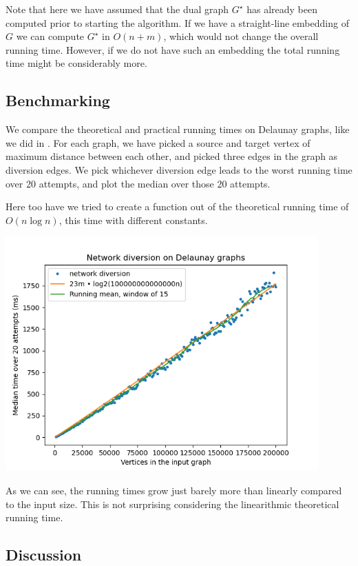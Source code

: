 Note that here we have assumed that the dual graph $G^\star$ has already been computed prior to starting the algorithm. If we have a straight-line embedding of $G$ we can compute $G^\star$ in $O(n+m)$, which would not change the overall running time. However, if we do not have such an embedding the total running time might be considerably more.

\subsection{Benchmarking}
We compare the theoretical and practical running times on Delaunay graphs, like we did in . For each graph, we have picked a source and target vertex of maximum distance between each other, and picked three edges in the graph as diversion edges. We pick whichever diversion edge leads to the worst running time over 20 attempts, and plot the median over those 20 attempts.

Here too have we tried to create a function out of the theoretical running time of $O(n \log n)$, this time with different constants.

\includegraphics[width=12cm]{figures/bench_plots/network diversion.png}

As we can see, the running times grow just barely more than linearly compared to the input size. This is not surprising considering the linearithmic theoretical running time.



\subsection{Discussion}
